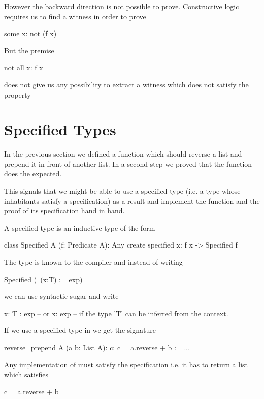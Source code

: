 However the backward direction is not possible to prove. Constructive logic
requires us to find a witness in order to prove
\begin{alba}
  some x: not (f x)
\end{alba}
%
But the premise
%
\begin{alba}
  not all x: f x
\end{alba}
does not give us any possibility to extract a witness which does not satisfy
the property 










\section{Specified Types}

In the previous section we defined a function  which
should reverse a list and prepend it in front of another list. In a second
step we proved that the function does the expected.

This signals that we might be able to use a specified type (i.e. a type whose
inhabitants satisfy a specification) as a result and implement the function
and the proof of its specification hand in hand.

A specified type is an inductive type of the form
%
\begin{alba}
   class Specified A (f: Predicate A): Any create
     specified x: f x -> Specified f
\end{alba}

The type  is known to the compiler and instead of writing
%
\begin{alba}
  Specified (\ (x:T) := exp)
\end{alba}
%
we can use syntactic sugar and write
%
\begin{alba}
  {x: T : exp}
  -- or
  {x: exp}     -- if the type 'T' can be inferred from the context.
\end{alba}


If we use a specified type in  we get the signature
\begin{alba}
  reverse_prepend A (a b: List A): {c: c = a.reverse + b} :=
    ...
\end{alba}

Any implementation of  must satisfy the specification
i.e. it has to return a list  which satisfies
\begin{alba}
  c = a.reverse + b
\end{alba}


